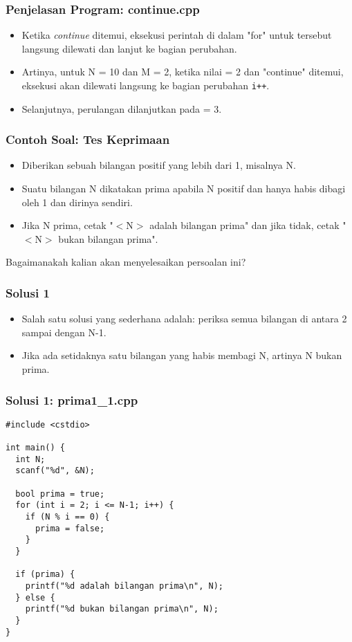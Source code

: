 \begin{frame}
\frametitle{Penjelasan Program: continue.cpp}
\begin{itemize}
  \item Ketika \textit{continue} ditemui, eksekusi perintah di dalam "for" untuk  tersebut langsung dilewati dan lanjut ke bagian perubahan.
  \item Artinya, untuk N = 10 dan M = 2, ketika nilai  = 2 dan "continue" ditemui, eksekusi akan dilewati langsung ke bagian perubahan \texttt{i++}. 
  \item Selanjutnya, perulangan dilanjutkan pada  = 3.
\end{itemize}
\end{frame}


\begin{frame}
\frametitle{Contoh Soal: Tes Keprimaan}
\begin{itemize}
  \item Diberikan sebuah bilangan positif yang lebih dari 1, misalnya N.
  \item Suatu bilangan N dikatakan prima apabila N positif dan hanya habis dibagi oleh 1 dan dirinya sendiri.
  \item Jika N prima, cetak "$<$N$>$ adalah bilangan prima" dan jika tidak, cetak "$<$N$>$ bukan bilangan prima".
\end{itemize}
Bagaimanakah kalian akan menyelesaikan persoalan ini?
\end{frame}

\begin{frame}
\frametitle{Solusi 1}
\begin{itemize}
  \item Salah satu solusi yang sederhana adalah: periksa semua bilangan di antara 2 sampai dengan N-1.
  \item Jika ada setidaknya satu bilangan yang habis membagi N, artinya N bukan prima.
\end{itemize}
\end{frame}


\begin{frame}[fragile]
\frametitle{Solusi 1: prima1\_1.cpp}
\begin{lstlisting}
#include <cstdio>

int main() {
  int N;
  scanf("%d", &N);

  bool prima = true;
  for (int i = 2; i <= N-1; i++) {
    if (N % i == 0) {
      prima = false;
    }
  }

  if (prima) {
    printf("%d adalah bilangan prima\n", N);
  } else {
    printf("%d bukan bilangan prima\n", N);
  }
}
\end{lstlisting}
\end{frame}

